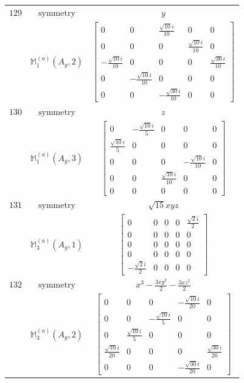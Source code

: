 \documentclass[fleqn,8pt,landscape]{jsarticle}
\begin{document}
\begin{longtable}{ccc}
$ 129 $ & $ \text{symmetry} $ & $ y $ \\
$  $ & $ \mathbb{M}_{1}^{(a)}(A_{g},2) $ & $ \begin{bmatrix} 0 & 0 & \frac{\sqrt{10} i}{10} & 0 & 0 \\ 0 & 0 & 0 & \frac{\sqrt{10} i}{10} & 0 \\ - \frac{\sqrt{10} i}{10} & 0 & 0 & 0 & \frac{\sqrt{30} i}{10} \\ 0 & - \frac{\sqrt{10} i}{10} & 0 & 0 & 0 \\ 0 & 0 & - \frac{\sqrt{30} i}{10} & 0 & 0 \end{bmatrix} $ \\ \hline
$ 130 $ & $ \text{symmetry} $ & $ z $ \\
$  $ & $ \mathbb{M}_{1}^{(a)}(A_{g},3) $ & $ \begin{bmatrix} 0 & - \frac{\sqrt{10} i}{5} & 0 & 0 & 0 \\ \frac{\sqrt{10} i}{5} & 0 & 0 & 0 & 0 \\ 0 & 0 & 0 & - \frac{\sqrt{10} i}{10} & 0 \\ 0 & 0 & \frac{\sqrt{10} i}{10} & 0 & 0 \\ 0 & 0 & 0 & 0 & 0 \end{bmatrix} $ \\ \hline
$ 131 $ & $ \text{symmetry} $ & $ \sqrt{15} x y z $ \\
$  $ & $ \mathbb{M}_{3}^{(a)}(A_{g},1) $ & $ \begin{bmatrix} 0 & 0 & 0 & 0 & \frac{\sqrt{2} i}{2} \\ 0 & 0 & 0 & 0 & 0 \\ 0 & 0 & 0 & 0 & 0 \\ 0 & 0 & 0 & 0 & 0 \\ - \frac{\sqrt{2} i}{2} & 0 & 0 & 0 & 0 \end{bmatrix} $ \\ \hline
$ 132 $ & $ \text{symmetry} $ & $ x^{3} - \frac{3 x y^{2}}{2} - \frac{3 x z^{2}}{2} $ \\
$  $ & $ \mathbb{M}_{3}^{(a)}(A_{g},2) $ & $ \begin{bmatrix} 0 & 0 & 0 & - \frac{\sqrt{10} i}{20} & 0 \\ 0 & 0 & - \frac{\sqrt{10} i}{5} & 0 & 0 \\ 0 & \frac{\sqrt{10} i}{5} & 0 & 0 & 0 \\ \frac{\sqrt{10} i}{20} & 0 & 0 & 0 & \frac{\sqrt{30} i}{20} \\ 0 & 0 & 0 & - \frac{\sqrt{30} i}{20} & 0 \end{bmatrix} $ \\ \hline

\end{longtable}
\end{document}
